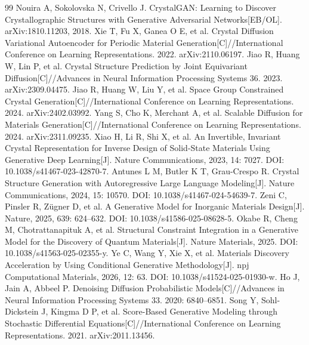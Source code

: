 \cleardoublepage
{}

\begin{thebibliography}{99}
\setlength{\itemsep}{0pt}
 Nouira A, Sokolovska N, Crivello J. CrystalGAN: Learning to Discover Crystallographic Structures with Generative Adversarial Networks[EB/OL]. arXiv:1810.11203, 2018.
 Xie T, Fu X, Ganea O E, et al. Crystal Diffusion Variational Autoencoder for Periodic Material Generation[C]//International Conference on Learning Representations. 2022. arXiv:2110.06197.
 Jiao R, Huang W, Lin P, et al. Crystal Structure Prediction by Joint Equivariant Diffusion[C]//Advances in Neural Information Processing Systems 36. 2023. arXiv:2309.04475.
 Jiao R, Huang W, Liu Y, et al. Space Group Constrained Crystal Generation[C]//International Conference on Learning Representations. 2024. arXiv:2402.03992.
 Yang S, Cho K, Merchant A, et al. Scalable Diffusion for Materials Generation[C]//International Conference on Learning Representations. 2024. arXiv:2311.09235.
 Xiao H, Li R, Shi X, et al. An Invertible, Invariant Crystal Representation for Inverse Design of Solid-State Materials Using Generative Deep Learning[J]. Nature Communications, 2023, 14: 7027. DOI: 10.1038/s41467-023-42870-7.
 Antunes L M, Butler K T, Grau-Crespo R. Crystal Structure Generation with Autoregressive Large Language Modeling[J]. Nature Communications, 2024, 15: 10570. DOI: 10.1038/s41467-024-54639-7.
 Zeni C, Pinsler R, Zügner D, et al. A Generative Model for Inorganic Materials Design[J]. Nature, 2025, 639: 624--632. DOI: 10.1038/s41586-025-08628-5.
 Okabe R, Cheng M, Chotrattanapituk A, et al. Structural Constraint Integration in a Generative Model for the Discovery of Quantum Materials[J]. Nature Materials, 2025. DOI: 10.1038/s41563-025-02355-y.
 Ye C, Wang Y, Xie X, et al. Materials Discovery Acceleration by Using Conditional Generative Methodology[J]. npj Computational Materials, 2026, 12: 63. DOI: 10.1038/s41524-025-01930-w.
 Ho J, Jain A, Abbeel P. Denoising Diffusion Probabilistic Models[C]//Advances in Neural Information Processing Systems 33. 2020: 6840--6851.
 Song Y, Sohl-Dickstein J, Kingma D P, et al. Score-Based Generative Modeling through Stochastic Differential Equations[C]//International Conference on Learning Representations. 2021. arXiv:2011.13456.

\end{thebibliography}

